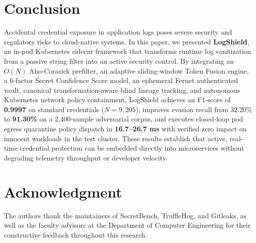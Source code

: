 \documentclass[conference]{IEEEtran}
\begin{document}
\section{Conclusion}
Accidental credential exposure in application logs poses severe security and regulatory risks to cloud-native systems. In this paper, we presented \textbf{LogShield}, an in-pod Kubernetes sidecar framework that transforms runtime log sanitization from a passive string filter into an active security control. By integrating an $O(N)$ Aho-Corasick prefilter, an adaptive sliding-window Token Fusion engine, a 6-factor Secret Confidence Score model, an ephemeral Fernet authenticated vault, canonical transformation-aware blind lineage tracking, and autonomous Kubernetes network policy containment, LogShield achieves an F1-score of \textbf{0.9997} on standard credentials ($N=9,205$), improves evasion recall from 32.20\% to \textbf{91.30\%} on a 2,400-sample adversarial corpus, and executes closed-loop pod egress quarantine policy dispatch in \textbf{16.7--26.7 ms} with verified zero impact on innocent workloads in the test cluster. These results establish that active, real-time credential protection can be embedded directly into microservices without degrading telemetry throughput or developer velocity.

\section*{Acknowledgment}
The authors thank the maintainers of SecretBench, TruffleHog, and Gitleaks, as well as the faculty advisors at the Department of Computer Engineering for their constructive feedback throughout this research.
\end{document}
